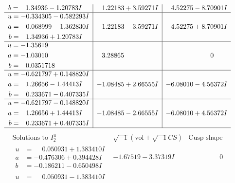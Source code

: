\documentclass[1p]{elsarticle_modified}
\theoremstyle{definition}
\newcommand{\I}{\sqrt{-1}}
\begin{document}
$$\begin{array}{c|c|c}
\begin{aligned}
b &= \phantom{-}1.34936 - 1.20783 I\end{aligned}
 & \phantom{-}1.22183 + 3.59271 I & \phantom{-}4.52275 - 8.70901 I \\ \hline\begin{aligned}
u &= -0.334305 - 0.582293 I \\
a &= -0.068999 - 1.362830 I \\
b &= \phantom{-}1.34936 + 1.20783 I\end{aligned}
 & \phantom{-}1.22183 - 3.59271 I & \phantom{-}4.52275 + 8.70901 I \\ \hline\begin{aligned}
u &= -1.35619\phantom{ +0.000000I} \\
a &= -1.03010\phantom{ +0.000000I} \\
b &= \phantom{-}0.0351718\phantom{ +0.000000I}\end{aligned}
 & \phantom{-}3.28865\phantom{ +0.000000I} & \phantom{-0.000000 } 0 \\ \hline\begin{aligned}
u &= -0.621797 + 0.148820 I \\
a &= \phantom{-}1.26656 - 1.44413 I \\
b &= \phantom{-}0.233671 - 0.407335 I\end{aligned}
 & -1.08485 + 2.66555 I & -6.08010 - 4.56372 I \\ \hline\begin{aligned}
u &= -0.621797 - 0.148820 I \\
a &= \phantom{-}1.26656 + 1.44413 I \\
b &= \phantom{-}0.233671 + 0.407335 I\end{aligned}
 & -1.08485 - 2.66555 I & -6.08010 + 4.56372 I\\
 \hline 
 \end{array}$$\newpage$$\begin{array}{c|c|c}  
\text{Solutions to }I^u_{2}& \I (\text{vol} + \sqrt{-1}CS) & \text{Cusp shape}\\
 \hline 
\begin{aligned}
u &= \phantom{-}0.050931 + 1.383410 I \\
a &= -0.476306 + 0.394428 I \\
b &= -0.186211 - 0.650498 I\end{aligned}
 & -1.67519 - 3.37319 I & \phantom{-0.000000 } 0 \\ \hline\begin{aligned}
u &= \phantom{-}0.050931 - 1.383410 I \\

\end{aligned}
\end{array}$$
\end{document}
